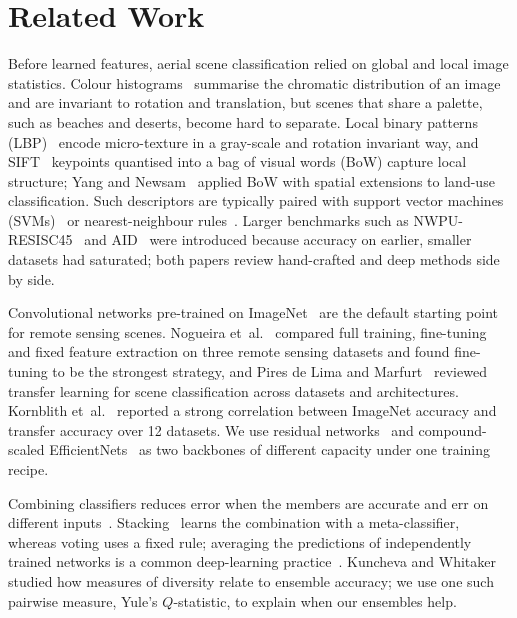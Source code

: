 \section{Related Work}
\label{sec:related}

Before learned features, aerial scene classification relied on global and local image statistics.
Colour histograms~\cite{swain1991color} summarise the chromatic distribution of an image and are invariant to rotation and translation, but scenes that share a palette, such as beaches and deserts, become hard to separate.
Local binary patterns (LBP)~\cite{ojala2002lbp} encode micro-texture in a gray-scale and rotation invariant way, and SIFT~\cite{lowe2004sift} keypoints quantised into a bag of visual words (BoW) capture local structure; Yang and Newsam~\cite{yang2010bovw} applied BoW with spatial extensions to land-use classification.
Such descriptors are typically paired with support vector machines (SVMs)~\cite{cortes1995svm} or nearest-neighbour rules~\cite{cover1967nn}.
Larger benchmarks such as NWPU-RESISC45~\cite{cheng2017remote} and AID~\cite{xia2017aid} were introduced because accuracy on earlier, smaller datasets had saturated; both papers review hand-crafted and deep methods side by side.

Convolutional networks pre-trained on ImageNet~\cite{deng2009imagenet} are the default starting point for remote sensing scenes.
Nogueira et~al.~\cite{nogueira2017towards} compared full training, fine-tuning and fixed feature extraction on three remote sensing datasets and found fine-tuning to be the strongest strategy, and Pires de Lima and Marfurt~\cite{pires2020transfer} reviewed transfer learning for scene classification across datasets and architectures.
Kornblith et~al.~\cite{kornblith2019transfer} reported a strong correlation between ImageNet accuracy and transfer accuracy over 12 datasets.
We use residual networks~\cite{he2016resnet} and compound-scaled EfficientNets~\cite{tan2019efficientnet} as two backbones of different capacity under one training recipe.

Combining classifiers reduces error when the members are accurate and err on different inputs~\cite{dietterich2000ensemble,rokach2010ensemble,sagi2018ensemble}.
Stacking~\cite{wolpert1992stacked} learns the combination with a meta-classifier, whereas voting uses a fixed rule; averaging the predictions of independently trained networks is a common deep-learning practice~\cite{lakshminarayanan2017deep,hinton2015distilling}.
Kuncheva and Whitaker~\cite{kuncheva2003diversity} studied how measures of diversity relate to ensemble accuracy; we use one such pairwise measure, Yule's $Q$-statistic, to explain when our ensembles help.

